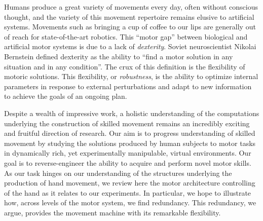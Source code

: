 \documentclass[../main.tex]{subfiles}
\begin{document}

  

\noindent Humans produce a great variety of movements every day, often without conscious thought, and the variety of this movement repertoire remains elusive to artificial systems. Movements such as bringing a cup of coffee to our lips are generally out of reach for state-of-the-art robotics. This ``motor gap'' between biological and artificial motor systems is due to a lack of \textit{dexterity}. Soviet neuroscientist Nikolai Bernstein defined dexterity as the ability to ``find a motor solution in any situation and in any condition''\cite{Bernstein1967}. The crux of this definition is the flexibility of motoric solutions. This flexibility, or \textit{robustness}\cite{kitanoBiologicalRobustness2004}, is the ability to optimize internal parameters in response to external perturbations and adapt to new information to achieve the goals of an ongoing plan. 

Despite a wealth of impressive work, a holistic understanding of the computations underlying the construction of skilled movement remains an incredibly exciting and fruitful direction of research. Our aim is to progress understanding of skilled movement by studying the solutions produced by human subjects to motor tasks in dynamically rich, yet experimentally manipulable, virtual environments. Our goal is to reverse-engineer the ability to acquire and perform novel motor skills. As our task hinges on our understanding of the structures underlying the production of hand movement, we review here the motor architecture controlling of the hand as it relates to our experiments. In particular, we hope to illustrate how, across levels of the motor system, we find redundancy. This redundancy, we argue, provides the movement machine with its remarkable flexibility.
\end{document}
